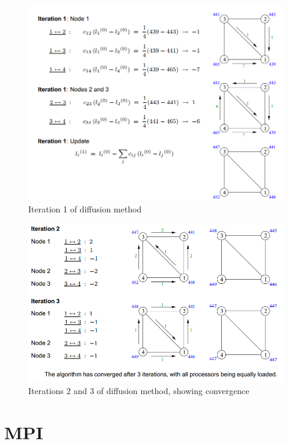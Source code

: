 \documentclass{article}
\begin{document}
\begin{figure}[H]
	\centering
	\includegraphics[scale=0.5]{figures/diffusion-method-example2.png}
	\caption{Iteration 1 of diffusion method}
	\label{fig:diffusion-method-example2}
\end{figure}

\begin{figure}[H]
	\centering
	\includegraphics[scale=0.5]{figures/diffusion-method-example3.png}
	\caption{Iterations 2 and 3 of diffusion method, showing convergence}
	\label{fig:diffusion-method-example3}
\end{figure}

\section{MPI}
\end{document}
